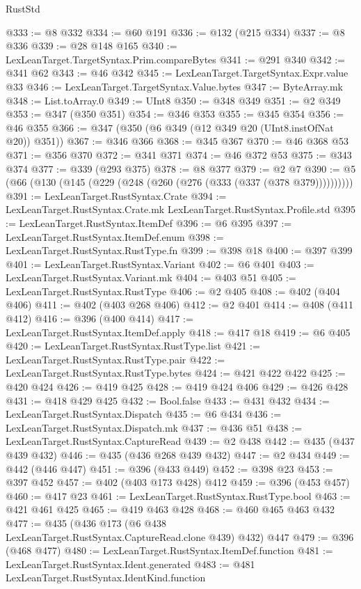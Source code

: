 \begin{lexlean}{RustStd}
\begin{coremodule}
@333 := @8 @332
@334 := @60 @191
@336 := @132 (@215 @334)
@337 := @8 @336
@339 := @28 @148 @165
@340 := LexLeanTarget.TargetSyntax.Prim.compareBytes
@341 := @291 @340
@342 := @341 @62
@343 := @46 @342
@345 := LexLeanTarget.TargetSyntax.Expr.value @33
@346 := LexLeanTarget.TargetSyntax.Value.bytes
@347 := ByteArray.mk
@348 := List.toArray.{0}
@349 := UInt8
@350 := @348 @349
@351 := @2 @349
@353 := @347 (@350 @351)
@354 := @346 @353
@355 := @345 @354
@356 := @46 @355
@366 := @347 (@350 (@6 @349 (@12 @349 @20 (UInt8.instOfNat @20)) @351))
@367 := @346 @366
@368 := @345 @367
@370 := @46 @368 @53
@371 := @356 @370
@372 := @341 @371
@374 := @46 @372 @53
@375 := @343 @374
@377 := @339 (@293 @375)
@378 := @8 @377
@379 := @2 @7
@390 := @5 (@66 (@130 (@145 (@229 (@248 (@260 (@276 (@333 (@337 (@378 @379))))))))))
@391 := LexLeanTarget.RustSyntax.Crate
@394 := LexLeanTarget.RustSyntax.Crate.mk LexLeanTarget.RustSyntax.Profile.std
@395 := LexLeanTarget.RustSyntax.ItemDef
@396 := @6 @395
@397 := LexLeanTarget.RustSyntax.ItemDef.enum
@398 := LexLeanTarget.RustSyntax.RustType.fn
@399 := @398 @18
@400 := @397 @399
@401 := LexLeanTarget.RustSyntax.Variant
@402 := @6 @401
@403 := LexLeanTarget.RustSyntax.Variant.mk
@404 := @403 @51
@405 := LexLeanTarget.RustSyntax.RustType
@406 := @2 @405
@408 := @402 (@404 @406)
@411 := @402 (@403 @268 @406)
@412 := @2 @401
@414 := @408 (@411 @412)
@416 := @396 (@400 @414)
@417 := LexLeanTarget.RustSyntax.ItemDef.apply
@418 := @417 @18
@419 := @6 @405
@420 := LexLeanTarget.RustSyntax.RustType.list
@421 := LexLeanTarget.RustSyntax.RustType.pair
@422 := LexLeanTarget.RustSyntax.RustType.bytes
@424 := @421 @422 @422
@425 := @420 @424
@426 := @419 @425
@428 := @419 @424 @406
@429 := @426 @428
@431 := @418 @429 @425
@432 := Bool.false
@433 := @431 @432
@434 := LexLeanTarget.RustSyntax.Dispatch
@435 := @6 @434
@436 := LexLeanTarget.RustSyntax.Dispatch.mk
@437 := @436 @51
@438 := LexLeanTarget.RustSyntax.CaptureRead
@439 := @2 @438
@442 := @435 (@437 @439 @432)
@446 := @435 (@436 @268 @439 @432)
@447 := @2 @434
@449 := @442 (@446 @447)
@451 := @396 (@433 @449)
@452 := @398 @23
@453 := @397 @452
@457 := @402 (@403 @173 @428) @412
@459 := @396 (@453 @457)
@460 := @417 @23
@461 := LexLeanTarget.RustSyntax.RustType.bool
@463 := @421 @461 @425
@465 := @419 @463 @428
@468 := @460 @465 @463 @432
@477 := @435 (@436 @173 (@6 @438 LexLeanTarget.RustSyntax.CaptureRead.clone @439) @432) @447
@479 := @396 (@468 @477)
@480 := LexLeanTarget.RustSyntax.ItemDef.function
@481 := LexLeanTarget.RustSyntax.Ident.generated
@483 := @481 LexLeanTarget.RustSyntax.IdentKind.function

\end{coremodule}
\end{lexlean}
